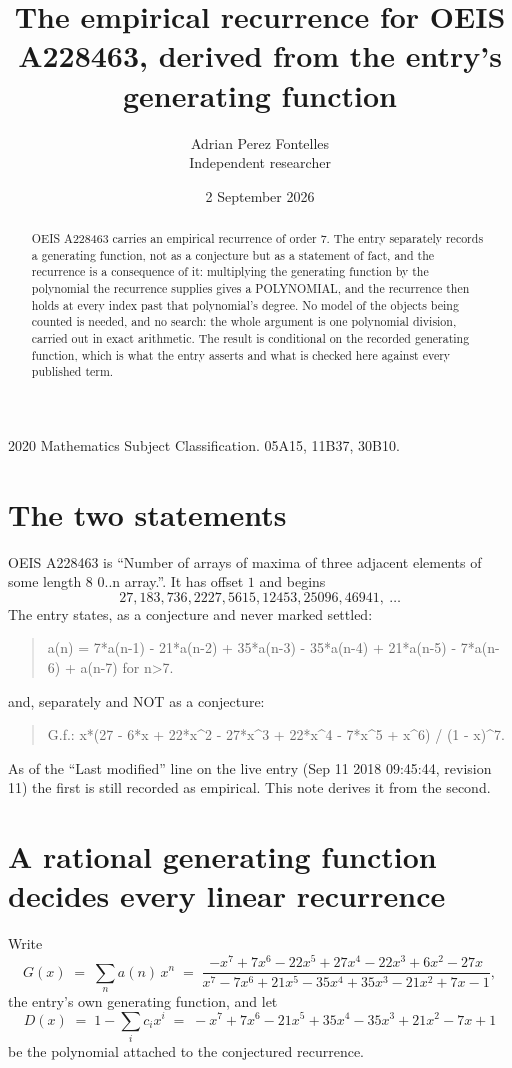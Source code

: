 \documentclass[11pt,a4paper]{article}
\title{The empirical recurrence for OEIS A228463, derived from the entry's generating function}
\author{Adrian Perez Fontelles\\ \small Independent researcher}
\date{2 September 2026}
\theoremstyle{plain}
\theoremstyle{definition}
\begin{document}
\maketitle

\begin{abstract}
OEIS A228463 carries an empirical recurrence of order $7$. The entry separately records a
generating function, not as a conjecture but as a statement of fact, and the recurrence is a
consequence of it: multiplying the generating function by the polynomial the recurrence
supplies gives a POLYNOMIAL, and the recurrence then holds at every index past that
polynomial's degree. No model of the objects being counted is needed, and no search: the
whole argument is one polynomial division, carried out in exact arithmetic. The result is
conditional on the recorded generating function, which is what the entry asserts and what is
checked here against every published term.
\end{abstract}

\noindent\small 2020 Mathematics Subject Classification. 05A15, 11B37, 30B10.\normalsize

\section{The two statements}

OEIS A228463 is ``Number of arrays of maxima of three adjacent elements of some length 8 0..n array.''. It has offset $1$ and begins
\[
27, 183, 736, 2227, 5615, 12453, 25096, 46941,\ \dots
\]
The entry states, as a conjecture and never marked settled:
\begin{quote}
a(n) = 7*a(n-1) - 21*a(n-2) + 35*a(n-3) - 35*a(n-4) + 21*a(n-5) - 7*a(n-6) + a(n-7) for n>7.
\end{quote}
and, separately and NOT as a conjecture:
\begin{quote}
G.f.: x*(27 - 6*x + 22*x\^{}2 - 27*x\^{}3 + 22*x\^{}4 - 7*x\^{}5 + x\^{}6) / (1 - x)\^{}7.
\end{quote}
As of the ``Last modified'' line on the live entry (Sep 11 2018 09:45:44, revision 11) the first is still
recorded as empirical. This note derives it from the second.

\section{A rational generating function decides every linear recurrence}

Write
\[
G(x)\;=\;\sum_{n}a(n)\,x^{n}\;=\;\frac{- x^{7} + 7 x^{6} - 22 x^{5} + 27 x^{4} - 22 x^{3} + 6 x^{2} - 27 x}{x^{7} - 7 x^{6} + 21 x^{5} - 35 x^{4} + 35 x^{3} - 21 x^{2} + 7 x - 1},
\]
the entry's own generating function, and let
\[
D(x)\;=\;1-\sum_i c_i x^{i}\;=\;- x^{7} + 7 x^{6} - 21 x^{5} + 35 x^{4} - 35 x^{3} + 21 x^{2} - 7 x + 1
\]
be the polynomial attached to the conjectured recurrence.
\end{document}
